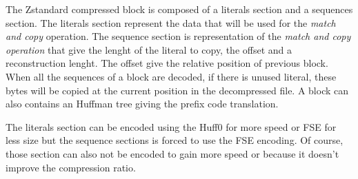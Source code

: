 \documentclass{sig-alternate-05-2015}
\begin{document}
    The Zstandard compressed block is composed of a literals section and a sequences section. The
    literals section represent the data that will be used for the \textit{match and copy} operation.
    The sequence section is representation of the \textit{match and copy operation} that give the lenght
    of the literal to copy, the offset and a reconstruction lenght. The offset give the relative
    position of previous block. When all the sequences of a block are decoded, if there is unused literal,
    these bytes will be copied at the current position in the decompressed file. A block can also
    contains an Huffman tree giving the prefix code translation.

    The literals section can be encoded using the Huff0 for more speed or FSE for less size but the
    sequence sections is forced to use the FSE encoding. Of course, those section can also not be
    encoded to gain more speed or because it doesn't improve the compression ratio.
\end{document}
